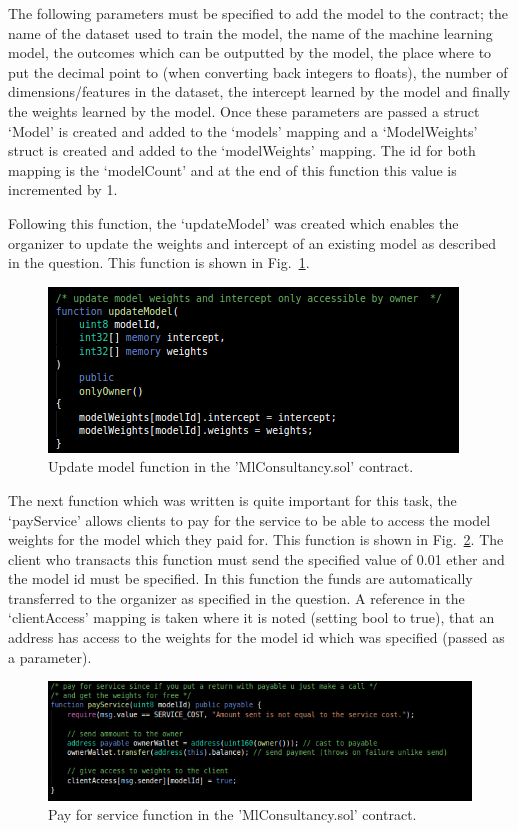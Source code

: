 \noindent
The following parameters must be specified to add the model to the contract; the name of the dataset used to train the model, the name of the machine learning model, the outcomes which can be outputted by the model, the place where to put the decimal point to (when converting back integers to floats), the number of dimensions/features in the dataset, the intercept learned by the model and finally the weights learned by the model.  Once these parameters are passed a struct ‘Model’ is created and added to the ‘models’ mapping and a ‘ModelWeights’ struct is created and added to the ‘modelWeights’ mapping. The id for both mapping is the ‘modelCount’ and at the end of this function this value is incremented by 1. 

\noindent
Following this function, the ‘updateModel’ was created which enables the organizer to update the weights and intercept of an existing model as described in the question. This function is shown in Fig.~\ref{fig:model_sol_6}. 

\begin{figure}[H]
\centering
  \includegraphics[scale = .75]{imgs/model_sol_6.png}
  \caption{Update model function in the 'MlConsultancy.sol' contract.}
  \label{fig:model_sol_6}
\end{figure}

\noindent
The next function which was written is quite important for this task, the ‘payService’ allows clients to pay for the service to be able to access the model weights for the model which they paid for. This function is shown in Fig.~\ref{fig:model_sol_7}. The client who transacts this function must send the specified value of 0.01 ether and the model id must be specified. In this function the funds are automatically transferred to the organizer as specified in the question. A reference in the ‘clientAccess’ mapping is taken where it is noted (setting bool to true), that an address has access to the weights for the model id which was specified (passed as a parameter).

\begin{figure}[H]
\centering
  \includegraphics[scale = .75]{imgs/model_sol_7.png}
  \caption{Pay for service function in the 'MlConsultancy.sol' contract.}
  \label{fig:model_sol_7}
\end{figure}

